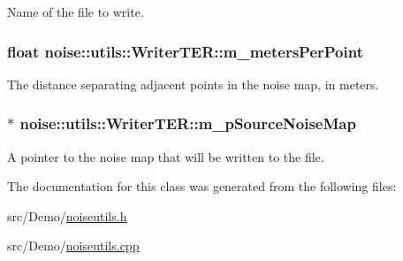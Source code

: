 Name of the file to write. 

\hypertarget{classnoise_1_1utils_1_1_writer_t_e_r_a66dd93d28d7157388c2e37dba5c08eff}{
\subsubsection[{m\+\_\+meters\+Per\+Point}]{\setlength{\rightskip}{0pt plus 5cm}float noise\+::utils\+::\+Writer\+T\+E\+R\+::m\+\_\+meters\+Per\+Point\hspace{0.3cm}{\ttfamily [protected]}}}\label{classnoise_1_1utils_1_1_writer_t_e_r_a66dd93d28d7157388c2e37dba5c08eff}
The distance separating adjacent points in the noise map, in meters. \hypertarget{classnoise_1_1utils_1_1_writer_t_e_r_ace70be9bceb0ae24ccf86376e189fd97}{
\subsubsection[{m\+\_\+p\+Source\+Noise\+Map}]{ $\ast$ noise\+::utils\+::\+Writer\+T\+E\+R\+::m\+\_\+p\+Source\+Noise\+Map\hspace{0.3cm}{\ttfamily [protected]}}}\label{classnoise_1_1utils_1_1_writer_t_e_r_ace70be9bceb0ae24ccf86376e189fd97}


A pointer to the noise map that will be written to the file. 



The documentation for this class was generated from the following files\+:\begin{DoxyCompactItemize}
\item 
src/\+Demo/\hyperlink{_demo_2noiseutils_8h}{noiseutils.\+h}\item 
src/\+Demo/\hyperlink{_demo_2noiseutils_8cpp}{noiseutils.\+cpp}\end{DoxyCompactItemize}
